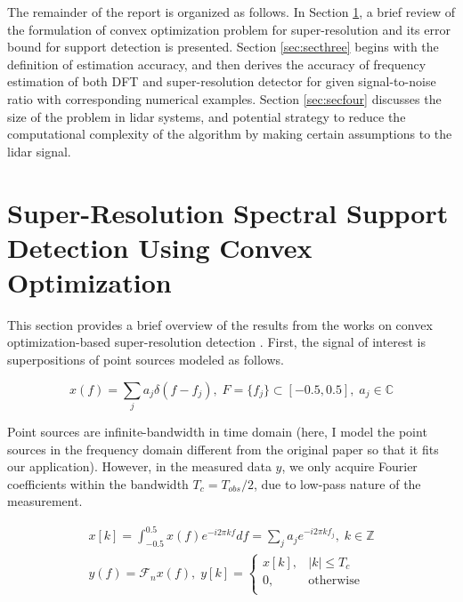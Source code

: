 \documentclass[11pt,journal, onecolumn]{IEEEtran}
\theoremstyle{theorem}
\begin{document}
The remainder of the report is organized as follows. In Section \ref{sec:sectwo}, a brief review of the formulation of convex optimization problem for super-resolution and its error bound for support detection is presented. Section \ref{sec:secthree} begins with the definition of estimation accuracy, and then derives the accuracy of frequency estimation of both DFT and super-resolution detector for given signal-to-noise ratio with corresponding numerical examples. Section \ref{sec:secfour} discusses the size of the problem in lidar systems, and potential strategy to reduce the computational complexity of the algorithm by making certain assumptions to the lidar signal. 


\section{
    Super-Resolution Spectral Support Detection Using Convex Optimization
}\label{sec:sectwo}
This section provides a brief overview of the results from the works on convex optimization-based super-resolution detection \cite{superres}\cite{superresnoise}\cite{superressupport}. First, the signal of interest is superpositions of point sources modeled as follows.

\begin{equation}
    x(f) = \sum_j{a_j\delta(f-f_j)},\; F=\{f_j\}\subset[-0.5,0.5],\; a_j\in \mathbb{C}
\end{equation}

\noindent Point sources are infinite-bandwidth in time domain (here, I model the point sources in the frequency domain different from the original paper so that it fits our application).  However, in the measured data $y$, we only acquire Fourier coefficients within the bandwidth $T_c=T_{obs}/2$, due to low-pass nature of the measurement.

\begin{gather}
    x[k] = \int_{-0.5}^{0.5}{x(f)e^{-i2\pi kf}df}=\sum_j{a_j}e^{-i2\pi kf_j},\; k\in \mathbb{Z} \\
    y(f) = \mathcal{F}_n x(f),\; y[k] =\left\{
    \begin{array}{cc}
        x[k],& |k|\leq T_c \\ 
        0,& \textrm{otherwise} \\
    \end{array}\right.
\end{gather}
\end{document}
